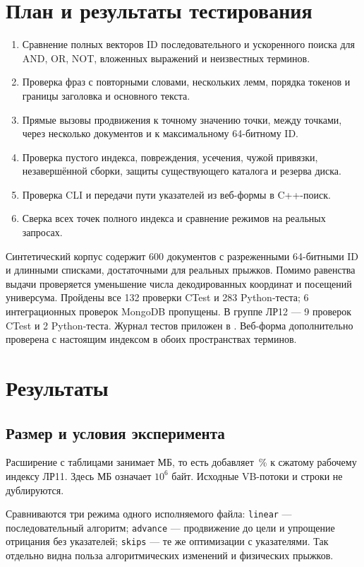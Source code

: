 \documentclass[12pt,a4paper]{article}
\begin{document}
\section{План и результаты тестирования}
\begin{enumerate}
\item Сравнение полных векторов ID последовательного и ускоренного поиска
для AND, OR, NOT, вложенных выражений и неизвестных терминов.
\item Проверка фраз с повторными словами, нескольких лемм, порядка токенов
и границы заголовка и основного текста.
\item Прямые вызовы продвижения к точному значению точки, между точками,
через несколько документов и к максимальному 64-битному ID.
\item Проверка пустого индекса, повреждения, усечения, чужой привязки,
незавершённой сборки, защиты существующего каталога и резерва диска.
\item Проверка CLI и передачи пути указателей из веб-формы в C++-поиск.
\item Сверка всех точек полного индекса и сравнение режимов на реальных запросах.
\end{enumerate}
Синтетический корпус содержит 600 документов с разреженными 64-битными ID
и длинными списками, достаточными для реальных прыжков. Помимо равенства
выдачи проверяется уменьшение числа декодированных координат и посещений
универсума. Пройдены все 132 проверки CTest и 283 Python-теста;
6 интеграционных проверок MongoDB пропущены. В группе ЛР12 ---
9 проверок CTest и 2 Python-теста.
Журнал тестов приложен в . Веб-форма дополнительно
проверена с настоящим индексом в обоих пространствах терминов.

\section{Результаты}
\subsection{Размер и условия эксперимента}
Расширение с таблицами занимает \LabTwelveSkipMB{} МБ,
то есть добавляет \LabTwelveOverhead\,\% к сжатому рабочему индексу ЛР11.
Здесь МБ означает $10^6$ байт. Исходные VB-потоки и строки не дублируются.

Сравниваются три режима одного исполняемого файла:
\texttt{linear} --- последовательный алгоритм;
\texttt{advance} --- продвижение до цели и упрощение отрицания без указателей;
\texttt{skips} --- те же оптимизации с указателями.
Так отдельно видна польза алгоритмических изменений и физических прыжков.
\end{document}
